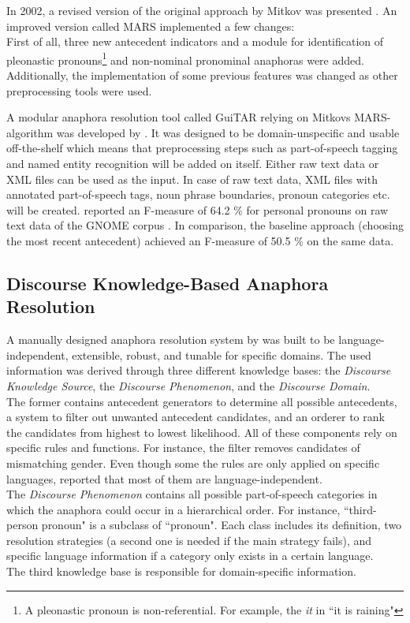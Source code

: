 In 2002, a revised version of the original approach by Mitkov was presented \citep{mitkov2002new}. An improved version called MARS implemented a few changes:\\
First of all, three new antecedent indicators and a module for identification of pleonastic pronouns\footnote{A pleonastic pronoun is non-referential. For example, the \textit{it} in ``it is raining" } and non-nominal pronominal anaphoras were added. Additionally, the implementation of some previous features was changed as other preprocessing tools were used.

A modular anaphora resolution tool called GuiTAR relying on Mitkovs MARS-algorithm \citep{mitkov2002new} was developed by \cite{poesio2004general}. It was designed to be domain-unspecific and usable off-the-shelf which means that preprocessing steps such as part-of-speech tagging and named entity recognition will be added on itself. Either raw text data or XML files can be used as the input. In case of raw text data, XML files with annotated part-of-speech tags, noun phrase boundaries, pronoun categories etc. will be created. \citep{poesio2004mate} reported an F-measure of 64.2 \% for personal pronouns on raw text data of the GNOME corpus \citep{poesio2004general}. In comparison, the baseline approach (choosing the most recent antecedent) achieved an F-measure of 50.5 \% on the same data.

\subsection{Discourse Knowledge-Based Anaphora Resolution}
\label{aonediscourseMD}
A manually designed anaphora resolution system by \citep{aone1993language} was built to be language-independent, extensible, robust, and tunable for specific domains. The used information was derived through three different knowledge bases: the \textit{Discourse Knowledge Source}, the \textit{Discourse Phenomenon}, and the \textit{Discourse Domain}. \\
The former contains antecedent generators to determine all possible antecedents, a system to filter out unwanted antecedent candidates, and an orderer to rank the candidates from highest to lowest likelihood. All of these components rely on specific rules and functions. For instance, the filter removes candidates of mismatching gender. Even though some the rules are only applied on specific languages, \cite{aone1993language} reported that most of them are language-independent.\\
The \textit{Discourse Phenomenon} contains all possible part-of-speech categories in which the anaphora could occur in a hierarchical order. For instance, ``third-person pronoun" is a subclass of ``pronoun". Each class includes its definition, two resolution strategies (a second one is needed if the main strategy fails), and specific language information if a category only exists in a certain language.\\
The third knowledge base is responsible for domain-specific information. 

